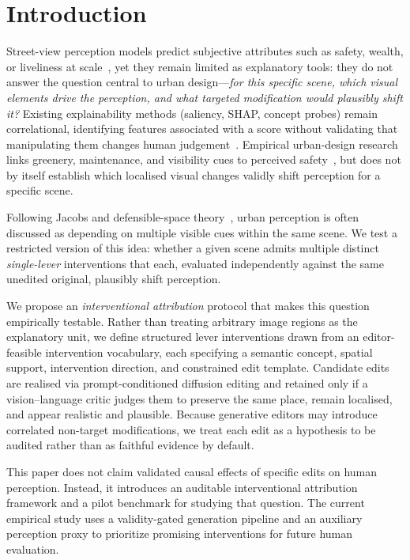 \section{Introduction}
\label{sec:intro}

Street-view perception models predict subjective attributes such as
safety, wealth, or liveliness at scale~\cite{salesses2013,naik2014,dubey2016},
yet they remain limited as explanatory tools: they do not answer the
question central to urban design---\emph{for this specific scene, which
visual elements drive the perception, and what targeted modification
would plausibly shift it?} Existing explainability methods (saliency,
SHAP, concept probes) remain correlational, identifying features
associated with a score without validating that manipulating them changes
human judgement~\cite{adebayo2018,kim2018}. Empirical urban-design
research links greenery, maintenance, and visibility cues to perceived
safety~\cite{li2015greenery,jiang2018brokenwindows,portnov2020lighting},
but does not by itself establish which localised visual changes validly
shift perception for a specific scene.

Following Jacobs and defensible-space
theory~\cite{jacobs1961,newman1972}, urban perception is often discussed
as depending on multiple visible cues within the same scene. We test a
restricted version of this idea: whether a given scene admits multiple
distinct \emph{single-lever} interventions that each, evaluated
independently against the same unedited original, plausibly shift
perception.

We propose an \emph{interventional attribution} protocol that makes this
question empirically testable. Rather than treating arbitrary image
regions as the explanatory unit, we define structured lever
interventions drawn from an editor-feasible intervention vocabulary,
each specifying a semantic concept, spatial support, intervention
direction, and constrained edit template. Candidate edits are realised
via prompt-conditioned diffusion editing and retained only if a
vision--language critic judges them to preserve the same place, remain
localised, and appear realistic and plausible. Because generative
editors may introduce correlated non-target modifications, we treat each
edit as a hypothesis to be audited rather than as faithful evidence by
default.

This paper does not claim validated causal effects of specific edits on human perception. Instead, it introduces an auditable interventional attribution framework and a pilot benchmark for studying that question. The current empirical study uses a validity-gated generation pipeline and an auxiliary perception proxy to prioritize promising interventions for future human evaluation.


